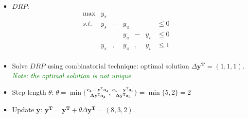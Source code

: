 \documentclass[mathserif]{beamer}
\begin{document}
{\begin{small}
\begin{itemize}
%   
\item $DRP$:   
\[
\begin{array}{rrrrrrrrrl}
 \max & y_s   & &    \\
 s.t. & y_s &-& y_u  & &     &  \leq 0 &  \\
     &  & &   y_u   &-& y_v &  \leq 0 & \\
      & y_s &,& y_u  &,& y_v &  \leq 1 &  \\
\end{array} \nonumber
\]
  


\item  Solve $DRP$  using combinatorial technique: optimal solution  $\Delta \mathbf{y^T} = (1, 1, 1)$. \textcolor{green}{{\it Note: the optimal solution  is not unique}}

\item Step length $\theta$: $\theta = \min \{ 
\frac{ \mathbf{c_4 - y^Ta_4} }{ \mathbf{\Delta y^T a_4}  } ,
\frac{ \mathbf{c_5 - y^Ta_5} }{ \mathbf{\Delta y^T a_5}  } 
\} = \min\{ 5, 2 \} = 2$

\item Update $\mathbf{y}$: $\mathbf{y^T=y^T}+\theta \Delta \mathbf{y^T}  = (8, 3, 2)$. 

\begin{figure}
\begin{tikzpicture}[scale=0.8, auto,swap]


\end{tikzpicture}
\end{figure}
\end{itemize}
\end{small}}
\end{document}
